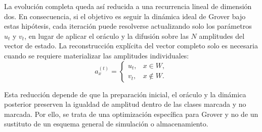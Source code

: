 La evolución completa queda así reducida a una recurrencia lineal de dimensión dos. En
consecuencia, si el objetivo es seguir la dinámica ideal de Grover bajo estas hipótesis, cada
iteración puede resolverse actualizando solo los parámetros $u_t$ y $v_t$, en lugar de
aplicar el oráculo y la difusión sobre las $N$ amplitudes del vector de estado. La
reconstrucción explícita del vector completo solo es necesaria cuando se requiere materializar
las amplitudes individuales:
\[
a_x^{(t)}=
\begin{cases}
u_t, & x\in W,\\
v_t, & x\notin W.
\end{cases}
\]

Esta reducción depende de que la preparación inicial, el oráculo y la dinámica posterior
preserven la igualdad de amplitud dentro de las clases marcada y no marcada. Por ello, se
trata de una optimización específica para Grover y no de un sustituto de un esquema general de
simulación o almacenamiento.
